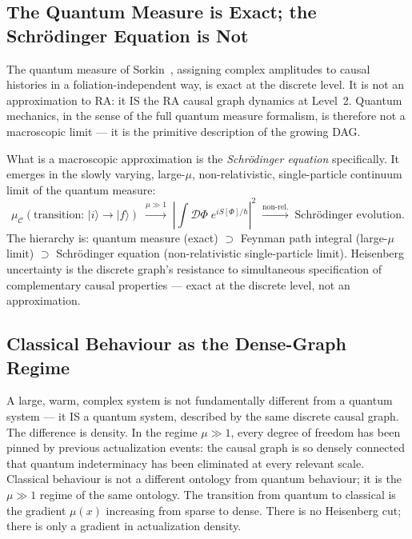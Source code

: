 \documentclass[11pt,a4paper]{article}
\begin{document}
\subsection{The Quantum Measure is Exact; the Schr\"{o}dinger Equation is Not}

The quantum measure of Sorkin~\citep{Sorkin1994}, assigning complex
amplitudes to causal histories in a foliation-independent way, is exact
at the discrete level. It is not an approximation to RA: it IS the RA
causal graph dynamics at Level~2. Quantum mechanics, in the sense of the
full quantum measure formalism, is therefore not a macroscopic limit ---
it is the primitive description of the growing DAG.

What is a macroscopic approximation is the \emph{Schr\"odinger equation}
specifically. It emerges in the slowly varying, large-$\mu$,
non-relativistic, single-particle continuum limit of the quantum measure:
\begin{equation}
  \mu_{\mathcal{C}}(\text{transition: } |i\rangle \to |f\rangle)
  \;\xrightarrow{\mu \gg 1}\;
  \left|\int \mathcal{D}\Phi\; e^{iS[\Phi]/\hbar}\right|^2
  \;\xrightarrow{\text{non-rel.}}\;
  \text{Schr\"odinger evolution.}
  \label{eq:schrodinger_limit}
\end{equation}
The hierarchy is: quantum measure (exact) $\supset$ Feynman path integral
(large-$\mu$ limit) $\supset$ Schr\"odinger equation (non-relativistic
single-particle limit). Heisenberg uncertainty is the discrete graph's
resistance to simultaneous specification of complementary causal properties
--- exact at the discrete level, not an approximation.

\subsection{Classical Behaviour as the Dense-Graph Regime}

A large, warm, complex system is not fundamentally different from a
quantum system --- it IS a quantum system, described by the same
discrete causal graph. The difference is density. In the regime
$\mu \gg 1$, every degree of freedom has been pinned by previous
actualization events: the causal graph is so densely connected that
quantum indeterminacy has been eliminated at every relevant scale.
Classical behaviour is not a different ontology from quantum behaviour;
it is the $\mu \gg 1$ regime of the same ontology. The transition
from quantum to classical is the gradient $\mu(x)$ increasing from
sparse to dense. There is no Heisenberg cut; there is only a
gradient in actualization density.
\end{document}

